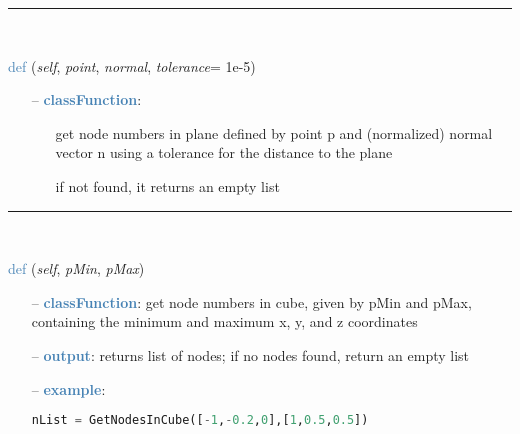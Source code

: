 \begin{itemize}[leftmargin=1.4cm]
\begin{itemize}[leftmargin=0.5cm]
\begin{itemize}[leftmargin=1.4cm]
\begin{itemize}[leftmargin=0.5cm]
%
\noindent\rule{8cm}{0.75pt}\vspace{1pt} \\ 
\begin{flushleft}
\noindent \textcolor{steelblue}{def {\bf {}}}\label{sec:FEM:FEMinterface:GetNodesInPlane}
({\it self}, {\it point}, {\it normal}, {\it tolerance}= 1e-5)
\end{flushleft}
\setlength{\itemindent}{0.7cm}
\begin{itemize}[leftmargin=0.7cm]
  \item[--]  \textcolor{steelblue}{\bf classFunction}: \vspace{-6pt}
  \begin{itemize}[leftmargin=1.2cm]
\setlength{\itemindent}{-0.7cm}
    \item[] get node numbers in plane defined by point p and (normalized) normal vector n using a tolerance for the distance to the plane
    \item[] if not found, it returns an empty list
  \end{itemize}
\vspace{12pt}\end{itemize}
%
\noindent\rule{8cm}{0.75pt}\vspace{1pt} \\ 
\begin{flushleft}
\noindent \textcolor{steelblue}{def {\bf {}}}\label{sec:FEM:FEMinterface:GetNodesInCube}
({\it self}, {\it pMin}, {\it pMax})
\end{flushleft}
\setlength{\itemindent}{0.7cm}
\begin{itemize}[leftmargin=0.7cm]
  \item[--]  \textcolor{steelblue}{\bf classFunction}: get node numbers in cube, given by pMin and pMax, containing the minimum and maximum x, y, and z coordinates  \item[--]  \textcolor{steelblue}{\bf output}: returns list of nodes; if no nodes found, return an empty list  \item[--]  \textcolor{steelblue}{\bf example}: \vspace{-12pt}\ei\begin{lstlisting}[language=Python, xleftmargin=36pt]
nList = GetNodesInCube([-1,-0.2,0],[1,0.5,0.5])\end{lstlisting}\vspace{-24pt}\bi\item[]\vspace{-24pt}\vspace{12pt}\end{itemize}

\end{itemize}
\end{itemize}
\end{itemize}
\end{itemize}
